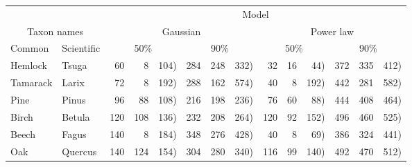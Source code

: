 \begin{table}
\begin{center}
\begin{tabular}{ll*{4}{r@{ (}r@{, }r}}
\toprule
                             &  & \multicolumn{12}{c}{Model} \\ \cmidrule(lr){3-14}
\multicolumn{2}{c}{Taxon names} & \multicolumn{6}{c}{Gaussian} & \multicolumn{6}{c}{Power law} \\  \cmidrule(lr){1-2}  \cmidrule(lr){3-8}  \cmidrule(lr){9-14}
Common & Scientific             & \multicolumn{3}{c}{50\%} & \multicolumn{3}{c}{90\%} & \multicolumn{3}{c}{50\%} & \multicolumn{3}{c}{90\%} \\
\cmidrule(lr){1-1} \cmidrule(lr){2-2} \cmidrule(lr){3-5} \cmidrule(lr){6-8} \cmidrule(lr){9-11} \cmidrule(lr){12-14}
Hemlock& Tsuga & 60 &   8 & 104) & 284 & 248 & 332)&32 &  16 &  44) & 372 & 335 & 412) \\
Tamarack& Larix & 72 &   8 & 192) & 288 & 162 & 574)&40 &   8 & 192) & 442 & 281 & 582) \\
Pine& Pinus & 96 &  88 & 108) & 216 & 198 & 236)&76 &  60 &  88) & 444 & 408 & 464) \\
Birch& Betula & 120 & 108 & 136) & 232 & 208 & 264)&120 &  92 & 152) & 496 & 460 & 525) \\
Beech& Fagus & 140 &   8 & 184) & 348 & 276 & 428)&40 &   8 &  69) & 386 & 324 & 441) \\
Oak& Quercus & 140 & 124 & 154) & 304 & 280 & 340)&116 &  99 & 140) & 492 & 470 & 512) \\

\end{tabular}
\end{center}
\end{table}
